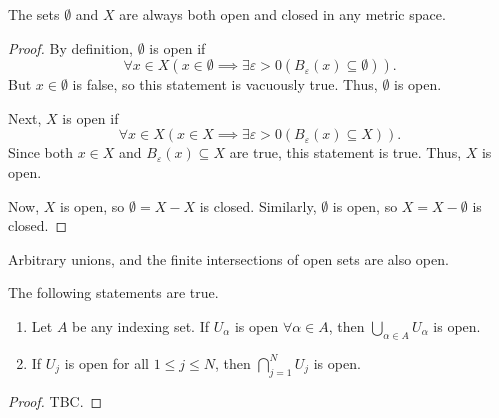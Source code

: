 \begin{nthm}
  The sets $\emptyset$ and $X$ are always both open and closed in any metric space.
\end{nthm}
\begin{proof}
  By definition, $\emptyset$ is open if
  \begin{equation*}
    \forall x \in X \left(x \in \emptyset \implies \exists\varepsilon>0 (B_{\varepsilon}(x) \subseteq \emptyset)\right).
  \end{equation*}
  But $x \in \emptyset$ is false, so this statement is vacuously true. Thus, $\emptyset$ is open.

  Next, $X$ is open if
  \begin{equation*}
    \forall x \in X \left(x \in X \implies \exists\varepsilon>0 (B_{\varepsilon}(x) \subseteq X)\right).
  \end{equation*}
  Since both $x \in X$ and $B_{\varepsilon}(x) \subseteq X$ are true, this statement is true. Thus, $X$ is open.

  Now, $X$ is open, so $\emptyset = X-X$ is closed. Similarly, $\emptyset$ is open, so $X = X-\emptyset$ is closed.
\end{proof}

Arbitrary unions, and the finite intersections of open sets are also open.
\begin{nthm}
  The following statements are true.
  \begin{enumerate}
  \item Let $A$ be any indexing set. If $U_{\alpha}$ is open $\forall\alpha\in A$, then $\bigcup_{\alpha\in A} U_{\alpha}$ is open.
  \item If $U_{j}$ is open for all $1 \leq j \leq N$, then $\bigcap_{j=1}^{N} U_{j}$ is open.
  \end{enumerate}
\end{nthm}
\begin{proof}
  TBC.
\end{proof}

